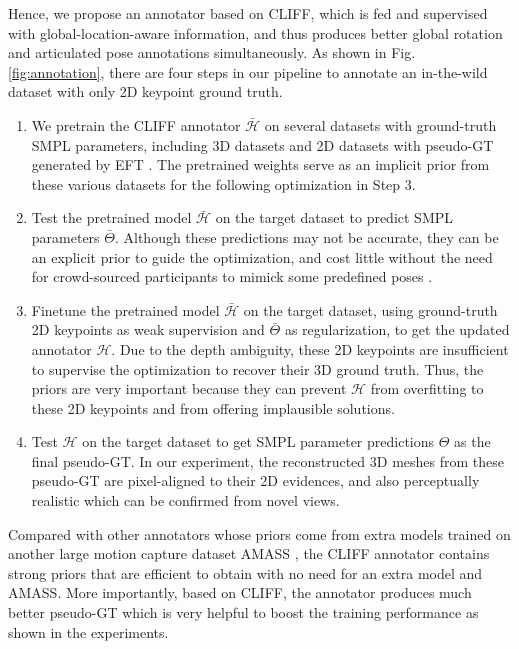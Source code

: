 \documentclass[runningheads]{llncs}
\begin{document}
Hence, we propose an annotator based on CLIFF, which is fed and supervised with global-location-aware information, and thus produces better global rotation and articulated pose annotations simultaneously.
As shown in Fig. \ref{fig:annotation}, there are four steps in our pipeline to annotate an in-the-wild dataset with only 2D keypoint ground truth.
\begin{enumerate}
\item We pretrain the CLIFF annotator $\bar{\mathcal{H}}$ on several datasets with ground-truth SMPL parameters, including 3D datasets and 2D datasets with pseudo-GT generated by EFT \cite{joo2021exemplar}.
The pretrained weights serve as an implicit prior from these various datasets for the following optimization in Step 3.

\item Test the pretrained model $\bar{\mathcal{H}}$ on the target dataset to predict SMPL parameters $\bar{\Theta}$.
Although these predictions may not be accurate, they can be an explicit prior to guide the optimization, and cost little without the need for crowd-sourced participants to mimick some predefined poses \cite{muller2021self,kocabas2021spec}.

\item Finetune the pretrained model $\bar{\mathcal{H}}$ on the target dataset, using ground-truth 2D keypoints as weak supervision and $\bar{\Theta}$ as regularization, to get the updated annotator $\mathcal{H}$.
Due to the depth ambiguity, these 2D keypoints are insufficient to supervise the optimization to recover their 3D ground truth. Thus, the priors are very important because they can prevent $\mathcal{H}$ from overfitting to these 2D keypoints and from offering implausible solutions.

\item Test $\mathcal{H}$ on the target dataset to get SMPL parameter predictions $\Theta$ as the final pseudo-GT. In our experiment, the reconstructed 3D meshes from these pseudo-GT are pixel-aligned to their 2D evidences, and also perceptually realistic which can be confirmed from novel views.
\end{enumerate}

Compared with other annotators whose priors come from extra models \cite{bogo2016keep,pavlakos2019expressive} trained on another large motion capture dataset AMASS \cite{mahmood2019amass}, the CLIFF annotator contains strong priors that are efficient to obtain with no need for an extra model and AMASS.
More importantly, based on CLIFF, the annotator produces much better pseudo-GT which is very helpful to boost the training performance as shown in the experiments.
\end{document}
